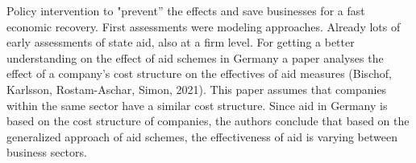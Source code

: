 Policy intervention to "prevent” the effects and save businesses for a fast economic recovery.
First assessments were modeling approaches.
Already lots of early assessments of state aid, also at a firm level.
For getting a better understanding on the effect of aid schemes in Germany a paper analyses the effect of a company’s cost structure on the effectives of aid measures (Bischof, Karlsson, Rostam-Aschar, Simon, 2021). 
This paper assumes that companies within the same sector have a similar cost structure. 
Since aid in Germany is based on the cost structure of companies, the authors conclude that based on the generalized approach of aid schemes, the effectiveness of aid is varying between business sectors.